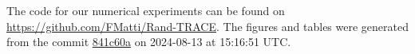 The code for our numerical experiments can be found on \url{https://github.com/FMatti/Rand-TRACE}. The figures and tables were generated from the commit \href{https://github.com/FMatti/Rand-TRACE/tree/841c60a}{841c60a} on 2024-08-13 at 15:16:51 UTC.
